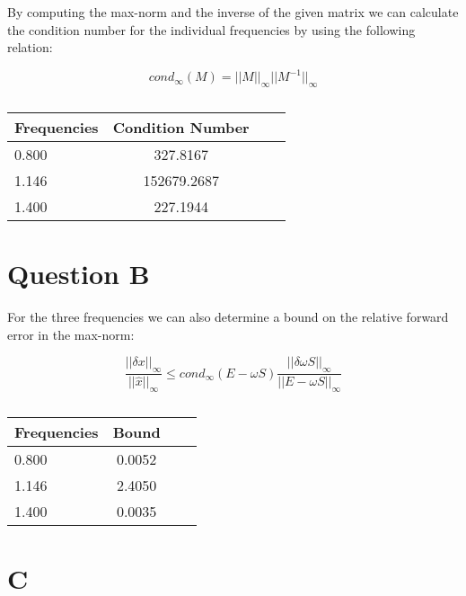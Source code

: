 \documentclass[a4paper,12pkt]{report}
\begin{document}
By computing the max-norm and the inverse of the given matrix we can calculate the condition number for the individual frequencies by using the following relation:

\begin{equation}
    cond_{\infty}(M) = ||M||_{\infty}||M^{-1}||_{\infty}
\end{equation}



\begin{table}[h!]
    \centering
    \begin{tabular}{l  c  c  c }
    \hline
     Frequencies & Condition Number \\ \hline
     0.800 & 327.8167 \\
     1.146 & 152679.2687\\
     1.400 & 227.1944
    \end{tabular}
    \caption{}
    \label{Confusion matrix scores}
\end{table}

\section*{Question B}

For the three frequencies we can also determine a bound on the relative forward error in the max-norm:

\begin{equation}
    \frac{||\delta x||_{\infty}}{||\hat{x}||_{\infty}} \leq cond_{\infty}(E-\omega S) \frac{||\delta \omega S||_{\infty}}{||E-\omega S||_{\infty}}
\end{equation}

\begin{table}[h!]
    \centering
    \begin{tabular}{l  c  c  c }
    \hline
     Frequencies & Bound \\ \hline
     0.800 & 0.0052 \\
     1.146 & 2.4050\\
     1.400 & 0.0035
    \end{tabular}
    \caption{}
\end{table}

\newpage

\section*{C}
\end{document}
